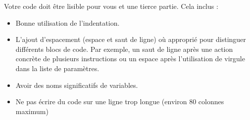 Votre code doit être lisible pour vous et une tierce partie. Cela inclus :
\begin{itemize}
    \item Bonne utilisation de l'indentation.
    \item L'ajout d'espacement (espace et saut de ligne) où approprié pour distinguer différents blocs de code. Par exemple, un saut de ligne après une action concrète de plusieurs instructions ou un espace après l'utilisation de virgule dans la liste de paramètres.
    \item Avoir des noms significatifs de variables.
    \item Ne pas écrire du code sur une ligne trop longue (environ 80 colonnes maximum)
\end{itemize}
